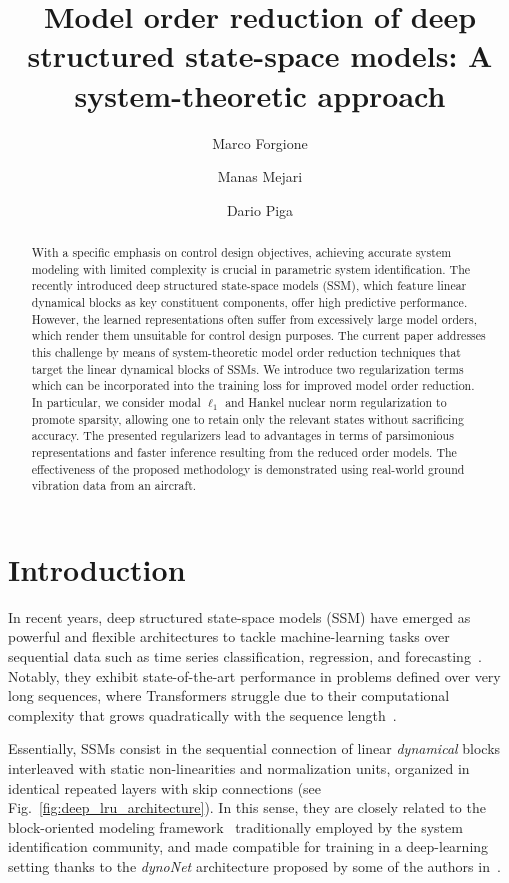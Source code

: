 \documentclass{article} %
\title{Model order reduction of deep structured state-space models: A system-theoretic approach}
\author{Marco Forgione}
\author{Manas Mejari}
\author{Dario Piga}
\affil{IDSIA Dalle Molle Institute for Artificial Intelligence USI-SUPSI, Via la Santa 1, CH-6962 Lugano-Viganello, Switzerland.}
\begin{document}
\maketitle





\begin{abstract}
With a specific emphasis on control design objectives, achieving accurate system modeling with limited complexity is crucial in parametric system identification.  
The recently introduced deep structured state-space models (SSM), which feature linear dynamical blocks as key constituent components, offer high predictive performance. However, the learned representations often suffer from excessively large model orders, which render them unsuitable for control design purposes.
The current paper addresses this challenge  by means of system-theoretic model order reduction techniques that target the linear dynamical blocks of SSMs. We introduce two regularization  terms which can be incorporated into the training loss for improved model order reduction. In particular, we consider modal $\ell_1$ and Hankel nuclear norm  regularization to promote sparsity, allowing one to retain only the relevant states without sacrificing accuracy. The presented regularizers lead to advantages in terms of parsimonious representations and faster inference resulting from  the reduced order models.
The effectiveness of the proposed methodology is demonstrated using real-world ground vibration data from an  aircraft.
\end{abstract}


\section{Introduction}
In recent years, deep structured state-space models (SSM) have emerged as  powerful and flexible architectures to tackle machine-learning tasks over sequential data such as time series classification, regression, and forecasting~\cite{Gu22, Gu21,  Orvieto23, Smith22}. Notably, they exhibit state-of-the-art performance in problems defined over very long sequences, where Transformers struggle due to their computational complexity that grows quadratically with the sequence length~\cite{Tay2020}. 

Essentially, SSMs consist in the sequential connection of linear \emph{dynamical} blocks interleaved with static non-linearities and normalization units, organized in identical repeated layers with skip connections (see Fig.~\ref{fig:deep_lru_architecture}). In this sense, they are closely related to the block-oriented modeling framework~\cite{ schoukens2017identification} traditionally employed by the system identification community, and  made compatible for training  in a deep-learning  setting thanks to the \emph{dynoNet} architecture proposed by some of the authors in~\cite{forgione21}. 
\end{document}
